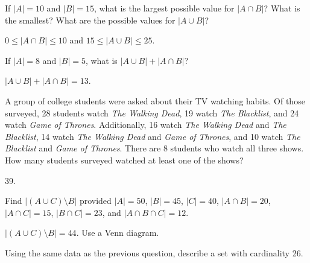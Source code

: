 \begin{questions}
\begin{answer}
  \end{answer}



\question If $|A| = 10$ and $|B| = 15$, what is the largest possible value for $|A \cap B|$?  What is the smallest?  What are the possible values for $|A \cup B|$?

  \begin{answer}
    $0 \le |A \cap B| \le 10$ and $15 \le |A \cup B| \le 25$.
  \end{answer}



\question If $|A| = 8$ and $|B| = 5$, what is $|A \cup B| + |A \cap B|$?

  \begin{answer}
      $|A \cup B| + |A \cap B| = 13$.
  \end{answer}




\question A group of college students were asked about their TV watching habits.  Of those surveyed, 28 students watch {\em The Walking Dead}, 19 watch {\em The Blacklist}, and 24 watch {\em Game of Thrones}.  Additionally, 16 watch {\em The Walking Dead} and {\em The Blacklist}, 14 watch {\em The Walking Dead} and {\em Game of Thrones}, and 10 watch {\em The Blacklist} and {\em Game of Thrones}.  There are 8 students who watch all three shows.  How many students surveyed watched at least one of the shows?

  \begin{answer}
    39.
  \end{answer}



\question Find $|(A \cup C)\setminus B|$ provided $|A| = 50$, $|B| = 45$, $|C| = 40$, $|A\cap B| = 20$, $|A \cap C| = 15$, $|B \cap C| = 23$, and $|A \cap B \cap C| = 12$.

    \begin{answer}
      $|(A \cup C)\setminus B| = 44$.  Use a Venn diagram.
    \end{answer}



\question Using the same data as the previous question, describe a set with cardinality 26.


\end{questions}
